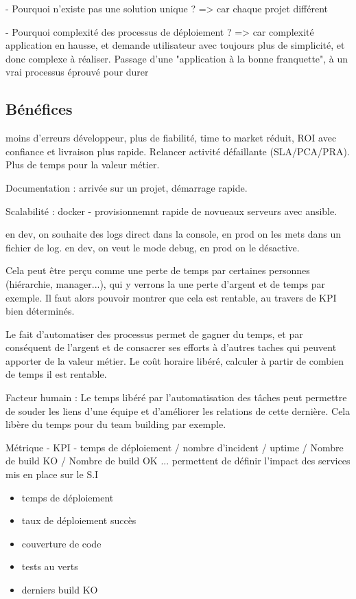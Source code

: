 
- Pourquoi n'existe pas une solution unique ? => car chaque projet différent 

- Pourquoi complexité des processus de déploiement ? => car complexité application en hausse, et demande utilisateur avec toujours plus de simplicité, et donc complexe à réaliser. Passage d'une "application à la bonne franquette", à un vrai processus éprouvé pour durer

\subsection*{Bénéfices}


moins d'erreurs développeur, plus de fiabilité, time to market réduit, ROI avec confiance et livraison plus rapide. Relancer activité défaillante (SLA/PCA/PRA). Plus de temps pour la valeur métier. 

Documentation : arrivée sur un projet, démarrage rapide.

Scalabilité : docker - provisionnemnt rapide de novueaux serveurs avec ansible.

en dev, on souhaite des logs direct dans la console, en prod on les mets dans un fichier de log.
en dev, on veut le mode debug, en prod on le désactive.

Cela peut être perçu comme une perte de temps par certaines personnes (hiérarchie, manager...), qui y verrons la une perte d'argent et de temps par exemple. Il faut alors pouvoir montrer que cela est rentable, au travers de \gls{KPI} bien déterminés.

Le fait d'automatiser des processus permet de gagner du temps, et par conséquent de l'argent et de consacrer ses efforts à d'autres taches qui peuvent apporter de la valeur métier. Le coût horaire libéré, calculer à partir de combien de temps il est rentable.

Facteur humain : Le temps libéré par l'automatisation des tâches peut permettre de souder les liens d'une équipe et d'améliorer les relations de cette dernière. Cela libère du temps pour du team building par exemple.

Métrique - KPI - temps de déploiement / nombre d'incident / uptime / Nombre de build KO / Nombre de build OK ... permettent de définir l'impact des services mis en place sur le S.I

\begin{itemize}
	\item temps de déploiement
	\item taux de déploiement succès
	\item couverture de code
	\item tests au verts
	\item derniers build KO
\end{itemize}


